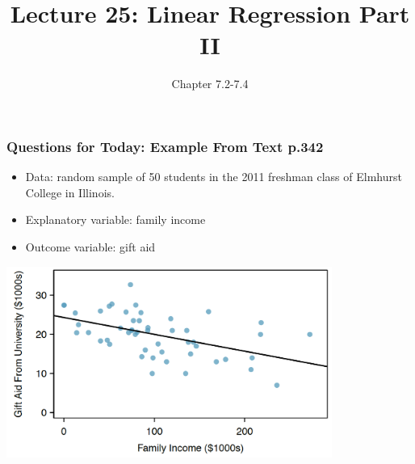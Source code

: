 \documentclass[slides]{beamer}
\title{Lecture 25: Linear Regression Part II}
\author{Chapter 7.2-7.4}
\date{}
\newcommand{\blue}[1]{\textcolor{blue2}{#1}}
\begin{document}
\begin{frame}
\titlepage
\end{frame}


%
%
%
%
%
%
%
%



\begin{frame}[fragile]
\frametitle{Questions for Today: Example From Text p.342}
\begin{itemize}
\item Data: random sample of 50 students in the 2011 freshman class of Elmhurst College in Illinois.
\pause\item Explanatory variable: family income
\pause\item Outcome variable: gift aid
\end{itemize}

\begin{center}
\includegraphics[width=0.8\textwidth]{figure/regression.png}
\end{center}

\end{frame}
\end{document}
